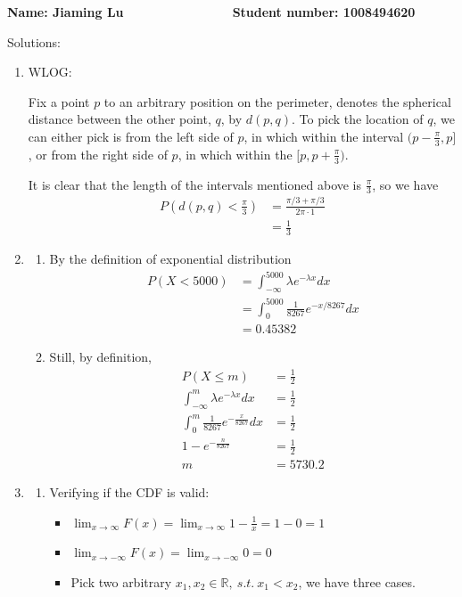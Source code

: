 \documentclass[a4paper, 12pt]{article}
\begin{document}
\textbf{Name: Jiaming Lu $~~~~~~~~~~~~~~~~~~~~~~~~~
~~~~~~~~~~~$ Student number: 1008494620}

Solutions:
\begin{enumerate}
	\item WLOG:

		Fix a point $p$ to an arbitrary position on the perimeter, 
		denotes the spherical distance between the other point, $q$, 
		by $d(p,q)$.
		To pick the location of $q$, we can either pick is from the left side 
		of $p$, in which within the interval $(p-\frac{\pi}{3},p]$, or from the 
		right side of $p$, in which within the $[p,p+\frac{\pi}{3})$.

		It is clear that the length of the intervals mentioned above is 
		$\frac{\pi}{3}$, so we have
		$$\begin{aligned}
			P(d(p,q) < \frac{\pi}{3}) 
			&= \frac{\pi/3+\pi/3}{2\pi \cdot 1}\\
			&= \frac{1}{3}
		\end{aligned}$$
	\item 
	\begin{enumerate}
		\item 
		By the definition of exponential distribution
		$$\begin{aligned}
			P(X<5000) 
			&= \int^{5000}_{-\infty} \lambda e^{-\lambda x} dx\\
			&= \int ^{5000}_{0}\frac{1}{8267} e^{-x/8267} dx\\
			&= 0.45382
		\end{aligned}$$
		\item 
			Still, by definition,
		$$\begin{aligned}
			P(X\leq m) &= \frac{1}{2}\\
			\int^{m}_{-\infty} \lambda e^{-\lambda x}dx &= \frac{1}{2}\\
			\int^{m}_{0} \frac{1}{8267} e^{-\frac{x}{8267}} dx &= \frac{1}{2}\\
			1-e^{-\frac{n}{8267}} &= \frac{1}{2}\\
			m &= 5730.2
		\end{aligned}$$
	\end{enumerate}

	\newpage
	\item 
		\begin{enumerate}
			\item 
	Verifying if the CDF is valid:
	\begin{itemize}
		\item $
				\lim _{x\to\infty}F(x)
				=\lim _{x\to\infty} 1-\frac{1}{x}
				= 1-0
				= 1$
		\item
			$\lim_{x\to -\infty}F(x) = \lim_{x\to-\infty}0 = 0$
		\item 
			Pick two arbitrary $x_1,x_2\in\mathbb{R},~ s.t.~ x_1<x_2$, we have 
			three cases.


\end{itemize}
\end{enumerate}
\end{enumerate}
\end{document}
